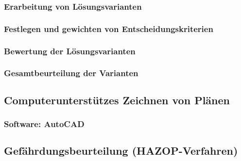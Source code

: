 \subsubsection{Erarbeitung von Lösungsvarianten}
\subsubsection{Festlegen und gewichten von Entscheidungskriterien}
\subsubsection{Bewertung der Lösungsvarianten}
\subsubsection{Gesamtbeurteilung der Varianten}

\subsection{Computerunterstützes Zeichnen von Plänen}
\subsubsection{Software: AutoCAD}

\subsection{Gefährdungsbeurteilung (HAZOP-Verfahren)}


